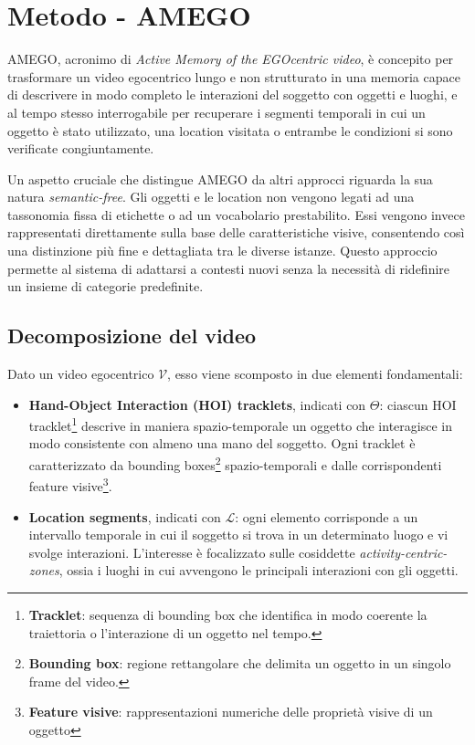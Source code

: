 \chapter{Metodo - AMEGO} 
AMEGO, acronimo di \emph{Active Memory of the EGOcentric video}, è concepito per trasformare un video egocentrico lungo e non strutturato in una memoria capace di descrivere in modo completo le interazioni del soggetto con oggetti e luoghi, e al tempo stesso interrogabile per recuperare i segmenti temporali in cui un oggetto è stato utilizzato, una location visitata o entrambe le condizioni si sono verificate congiuntamente.

Un aspetto cruciale che distingue AMEGO da altri approcci riguarda la sua natura \emph{semantic-free}.  
Gli oggetti e le location non vengono legati ad una tassonomia fissa di etichette o ad un vocabolario prestabilito. Essi vengono invece rappresentati direttamente sulla base delle caratteristiche visive, consentendo così una distinzione più fine e dettagliata tra le diverse istanze. Questo approccio permette al sistema di adattarsi a contesti nuovi senza la necessità di ridefinire un insieme di categorie predefinite.

\section{Decomposizione del video}
Dato un video egocentrico $\mathcal{V}$, esso viene scomposto in due elementi fondamentali:

\begin{itemize}
    \item \textbf{Hand-Object Interaction (HOI) tracklets}, indicati con $\Theta$: ciascun HOI tracklet\footnote{\textbf{Tracklet}: sequenza di bounding box che identifica in modo coerente la traiettoria o l’interazione di un oggetto nel tempo.} descrive in maniera spazio-temporale un oggetto che interagisce in modo consistente con almeno una mano del soggetto. Ogni tracklet è caratterizzato da bounding boxes\footnote{\textbf{Bounding box}: regione rettangolare che delimita un oggetto in un singolo frame del video.} spazio-temporali e dalle corrispondenti feature visive\footnote{\textbf{Feature visive}: rappresentazioni numeriche delle proprietà visive di un oggetto}.
    
    \item \textbf{Location segments}, indicati con $\mathcal{L}$: ogni elemento corrisponde a un intervallo temporale in cui il soggetto si trova in un determinato luogo e vi svolge interazioni. L’interesse è focalizzato sulle cosiddette \emph{activity-centric-zones}, ossia i luoghi in cui avvengono le principali interazioni con gli oggetti.
\end{itemize}

